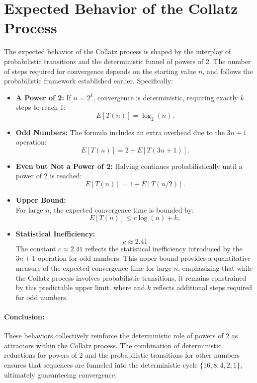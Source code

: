 \section{Expected Behavior of the Collatz Process}
The expected behavior of the Collatz process is shaped by the interplay of probabilistic transitions and the deterministic funnel of powers of 2. The number of steps required for convergence depends on the starting value \( n \), and follows the probabilistic framework established earlier. Specifically:
\begin{itemize}
    \item \textbf{A Power of 2:} If \( n = 2^k \), convergence is deterministic, requiring exactly \( k \) steps to reach 1:
    \[
    E[T(n)] = \log_2(n).
    \]
    \item \textbf{Odd Numbers:} The formula includes an extra overhead due to the \( 3n+1 \) operation:
    \[
    E[T(n)] = 2 + E[T(3n+1)].
    \]
    \item \textbf{Even but Not a Power of 2:} Halving continues probabilistically until a power of 2 is reached:
    \[
    E[T(n)] = 1 + E[T(n/2)].
    \]
    \item \textbf{Upper Bound:}\\For large \( n \), the expected convergence time is bounded by:
        \[
    E[T(n)] \leq c \log(n) + k,
    \]
    \item \textbf{Statistical Inefficiency:}\\
    $$
    c \approx 2.41
    $$
    The constant \( c \approx 2.41 \) reflects the statistical inefficiency introduced by the \( 3n+1 \) operation for odd numbers. This upper bound provides a quantitative measure of the expected convergence time for large \( n \), emphasizing that while the Collatz process involves probabilistic transitions, it remains constrained by this predictable upper limit.
    where  and \( k \) reflects additional steps required for odd numbers.
\end{itemize}

\paragraph{Conclusion:}
These behaviors collectively reinforce the deterministic role of powers of 2 as attractors within the Collatz process. The combination of deterministic reductions for powers of 2 and the probabilistic transitions for other numbers ensures that sequences are funneled into the deterministic cycle \( \{16, 8, 4, 2, 1\} \), ultimately guaranteeing convergence.



